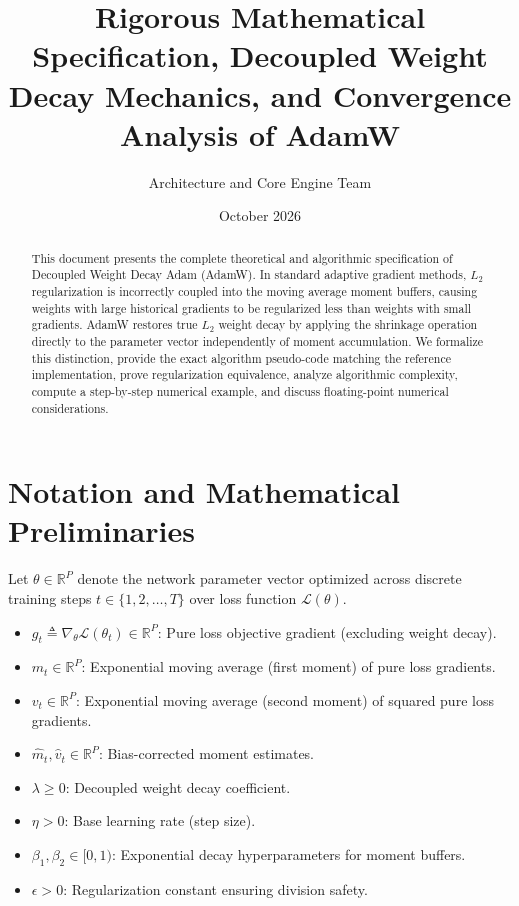 \documentclass[11pt,a4paper]{article}
\title{\textbf{Rigorous Mathematical Specification, Decoupled Weight Decay Mechanics, and Convergence Analysis of AdamW}}
\author{Architecture and Core Engine Team}
\date{October 2026}
\theoremstyle{definition}
\begin{document}
\maketitle

\begin{abstract}
This document presents the complete theoretical and algorithmic specification of Decoupled Weight Decay Adam (AdamW). In standard adaptive gradient methods, $L_2$ regularization is incorrectly coupled into the moving average moment buffers, causing weights with large historical gradients to be regularized less than weights with small gradients. AdamW restores true $L_2$ weight decay by applying the shrinkage operation directly to the parameter vector independently of moment accumulation. We formalize this distinction, provide the exact algorithm pseudo-code matching the reference implementation, prove regularization equivalence, analyze algorithmic complexity, compute a step-by-step numerical example, and discuss floating-point numerical considerations.
\end{abstract}

\section{Notation and Mathematical Preliminaries}

Let $\theta \in \mathbb{R}^P$ denote the network parameter vector optimized across discrete training steps $t \in \{1, 2, \dots, T\}$ over loss function $\mathcal{L}(\theta)$.

\begin{itemize}
    \item $g_t \triangleq \nabla_\theta \mathcal{L}(\theta_t) \in \mathbb{R}^P$: Pure loss objective gradient (excluding weight decay).
    \item $m_t \in \mathbb{R}^P$: Exponential moving average (first moment) of pure loss gradients.
    \item $v_t \in \mathbb{R}^P$: Exponential moving average (second moment) of squared pure loss gradients.
    \item $\hat{m}_t, \hat{v}_t \in \mathbb{R}^P$: Bias-corrected moment estimates.
    \item $\lambda \ge 0$: Decoupled weight decay coefficient.
    \item $\eta > 0$: Base learning rate (step size).
    \item $\beta_1, \beta_2 \in [0, 1)$: Exponential decay hyperparameters for moment buffers.
    \item $\epsilon > 0$: Regularization constant ensuring division safety.
\end{itemize}
\end{document}
